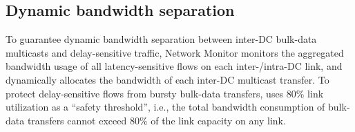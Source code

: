 \subsection{Dynamic bandwidth separation}
\label{subsec:system:separation}


To guarantee dynamic bandwidth separation between inter-DC
bulk-data multicasts and delay-sensitive traffic, \name Network
Monitor monitors the aggregated bandwidth usage of all
latency-sensitive flows on each inter-/intra-DC link, and
dynamically allocates the bandwidth of each inter-DC multicast
transfer.
To protect delay-sensitive flows from bursty bulk-data transfers,
\company uses 80\% link utilization as a ``safety threshold'',
i.e., the total bandwidth consumption of bulk-data transfers
cannot exceed 80\% of the link capacity on any link.




